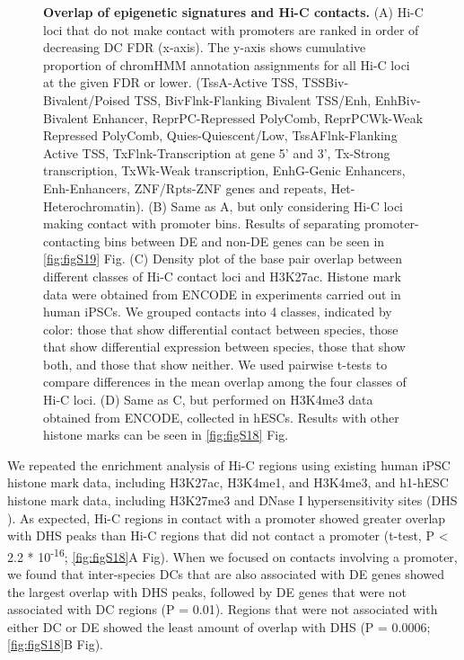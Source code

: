 \begin{figure}
\caption[Overlap of epigenetic signatures and Hi-C contacts.]{\textbf{Overlap of epigenetic signatures and Hi-C contacts.} (A) Hi-C loci that do not make contact with promoters are ranked in order of decreasing DC FDR (x-axis). The y-axis shows cumulative proportion of chromHMM annotation assignments for all Hi-C loci at the given FDR or lower. (TssA-Active TSS, TSSBiv-Bivalent/Poised TSS, BivFlnk-Flanking Bivalent TSS/Enh, EnhBiv-Bivalent Enhancer, ReprPC-Repressed PolyComb, ReprPCWk-Weak Repressed PolyComb, Quies-Quiescent/Low, TssAFlnk-Flanking Active TSS, TxFlnk-Transcription at gene 5' and 3', Tx-Strong transcription, TxWk-Weak transcription, EnhG-Genic Enhancers, Enh-Enhancers, ZNF/Rpts-ZNF genes and repeats, Het-Heterochromatin). (B) Same as A, but only considering Hi-C loci making contact with promoter bins. Results of separating promoter-contacting bins between DE and non-DE genes can be seen in \ref{fig:figS19} Fig. (C) Density plot of the base pair overlap between different classes of Hi-C contact loci and H3K27ac. Histone mark data were obtained from ENCODE in experiments carried out in human iPSCs. We grouped contacts into 4 classes, indicated by color: those that show differential contact between species, those that show differential expression between species, those that show both, and those that show neither. We used pairwise t-tests to compare differences in the mean overlap among the four classes of Hi-C loci. (D) Same as C, but performed on H3K4me3 data obtained from ENCODE, collected in hESCs. Results with other histone marks can be seen in \ref{fig:figS18} Fig.}
\label{fig:fig7}
\end{figure}

We repeated the enrichment analysis of Hi-C regions using existing human iPSC histone mark data, including H3K27ac, H3K4me1, and H3K4me3, and h1-hESC histone mark data, including H3K27me3 and DNase I hypersensitivity sites (DHS \cite{consortium.2012a}). As expected, Hi-C regions in contact with a promoter showed greater overlap with DHS peaks than Hi-C regions that did not contact a promoter (t-test, P {\textless} 2.2 * 10\textsuperscript{-16}; \ref{fig:figS18}A Fig). When we focused on contacts involving a promoter, we found that inter-species DCs that are also associated with DE genes showed the largest overlap with DHS peaks, followed by DE genes that were not associated with DC regions (P = 0.01). Regions that were not associated with either DC or DE showed the least amount of overlap with DHS (P = 0.0006; \ref{fig:figS18}B Fig).

